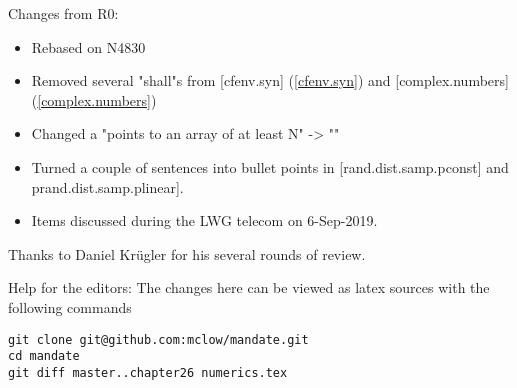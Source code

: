 Changes from R0:
\begin{itemize}
\item{Rebased on N4830}
\item{Removed several "shall"s from [cfenv.syn] (\ref{cfenv.syn}) and [complex.numbers] (\ref{complex.numbers})}
\item{Changed a "points to an array of at least N" -> "\tcode{[p, p+n) is a valid range}"}
\item{Turned a couple of sentences into bullet points in [rand.dist.samp.pconst] and prand.dist.samp.plinear].}
\item{Items discussed during the LWG telecom on 6-Sep-2019.}
\end{itemize}

Thanks to Daniel Krügler for his several rounds of review.

\vfill
Help for the editors: The changes here can be viewed as latex sources with the following commands
\begin{verbatim}
git clone git@github.com:mclow/mandate.git
cd mandate
git diff master..chapter26 numerics.tex
\end{verbatim}

